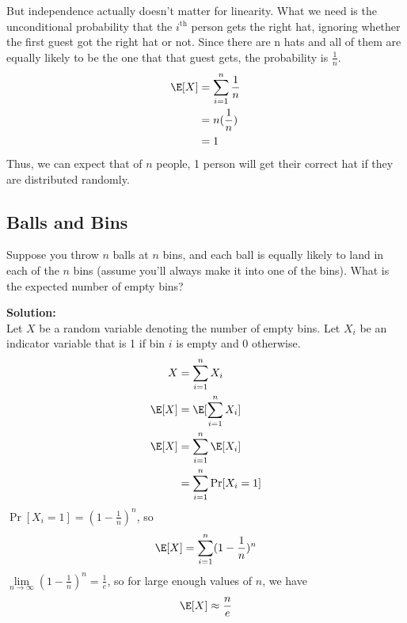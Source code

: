 But independence actually doesn’t matter for linearity. What we need is the unconditional probability that the $i^{\text{th}}$ person gets the right hat, ignoring whether the first guest got the right hat or not. Since there are n hats and all of them are equally likely to be the one that that guest gets, the probability is $\frac{1}{n}$.
    \begin{align*}
        \E[X] &= \sum_{i=1}^{n}\frac{1}{n} \\
        &= n(\frac{1}{n}) \\
        &= 1
    \end{align*}
Thus, we can expect that of $n$ people, 1 person will get their correct hat if they are distributed randomly.

\subsection*{Balls and Bins}
Suppose you throw $n$ balls at $n$ bins, and each ball is equally likely to land in each of the $n$ bins (assume you’ll always make it into one of the bins). What is the expected number of empty bins?

\vspace{2.5mm}

\textbf{Solution:} \\
Let $X$ be a random variable denoting the number of empty bins. Let $X_{i}$ be an indicator variable that is 1 if bin $i$ is empty and 0 otherwise.
    \begin{align*}
        X &= \sum_{i=1}^{n}X_{i} \\
        \E[X] &= \E[\sum_{i=1}^{n}X_{i}] \\
        \E[X] &= \sum_{i=1}^{n}\E[X_{i}] \\
        &= \sum_{i=1}^{n}\Pr[X_{i} = 1]
    \end{align*}
$\Pr[X_{i} = 1] = (1-\frac{1}{n})^{n}$, so
    $$
    \E[X] = \sum_{i=1}^{n}(1-\frac{1}{n})^{n}
    $$
$\lim\limits_{n \to \infty}(1-\frac{1}{n})^{n} = \frac{1}{e}$, so for large enough values of $n$, we have
    $$
    \E[X] \approx \frac{n}{e}
    $$

